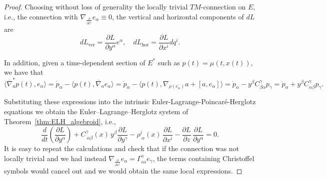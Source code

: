 \documentclass[11pt,a4paper]{article}
\theoremstyle{definition}
\begin{document}
\begin{proof}

Choosing without loss of generality the locally trivial $TM$-connection on $E$, i.e., the connection with $\nabla_{\frac{\partial}{\partial x^{i}}} e_{\alpha}\equiv 0$, the vertical and horizontal components of $dL$ are
$$dL_{\mathrm{ver}}=\frac{\partial L}{\partial y^{\alpha}}e^{\alpha}, \quad dL_{\mathrm{hor}}=\frac{\partial L}{\partial x^{i}}dq^{i}.$$

In addition, given a time-dependent section of $E^{*}$ such as $p(t)=\mu(t, x(t))$, we have that
$$\langle \overline{\nabla}_{a}^{*}p (t), e_{\alpha} \rangle = \dot{p}_{\alpha} - \langle p(t), \overline{\nabla}_{a} e_{\alpha} \rangle = \dot{p}_{\alpha} - \langle p(t), \nabla_{\rho(e_{\alpha})} a + [a, e_{\alpha}]  \rangle = \dot{p}_{\alpha} - y^{\beta} C_{\beta \alpha}^{\gamma} p_{\gamma} = \dot{p}_{\alpha} + y^{\beta} C_{\alpha \beta}^{\gamma} p_{\gamma}.$$

Substituting these expressions into the intrinsic Euler-Lagrange-Poincaré-Herglotz equations we obtain the Euler--Lagrange--Herglotz system of
Theorem~\ref{thm:ELH_algebroid}, i.e.,
$$\frac{d}{dt}\left(\frac{\partial L}{\partial y^\alpha}\right)
+ C^\gamma_{\ \alpha\beta}(x)\,y^\beta \frac{\partial L}{\partial y^\gamma}
- \rho^i_{\ \alpha}(x)\,\frac{\partial L}{\partial x^i}
- \frac{\partial L}{\partial z}\,\frac{\partial L}{\partial y^\alpha}
= 0.$$
It is easy to repeat the calculations and check that if the connection was not locally trivial and we had instead $\nabla_{\frac{\partial}{\partial x^{i}}} e_{\alpha}= \Gamma_{i\alpha}^{\gamma} e_{\gamma}$, the terms containing Christoffel symbols would cancel out and we would obtain the same local expressions.
\end{proof}



\end{document}
